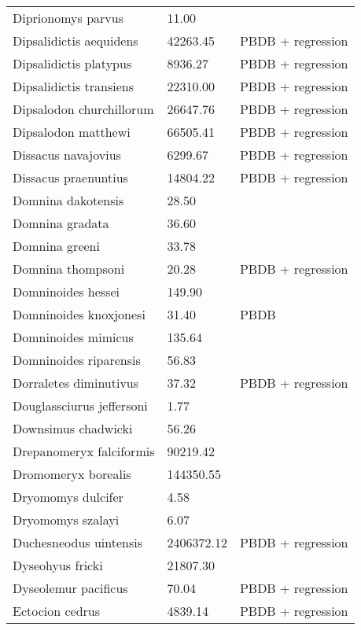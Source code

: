 \documentclass{article}
\begin{document}
\begin{center}
\begin{longtable}{p{} p{} p{}}
    Diprionomys parvus & 11.00 & \cite{McKenna2011} \\ 
    Dipsalidictis aequidens & 42263.45 & PBDB + regression \\ 
    Dipsalidictis platypus & 8936.27 & PBDB + regression \\ 
    Dipsalidictis transiens & 22310.00 & PBDB + regression \\ 
    Dipsalodon churchillorum & 26647.76 & PBDB + regression \\ 
    Dipsalodon matthewi & 66505.41 & PBDB + regression \\ 
    Dissacus navajovius & 6299.67 & PBDB + regression \\ 
    Dissacus praenuntius & 14804.22 & PBDB + regression \\ 
    Domnina dakotensis & 28.50 & \cite{Tomiya2013} \\ 
    Domnina gradata & 36.60 & \cite{Tomiya2013} \\ 
    Domnina greeni & 33.78 & \cite{Tomiya2013} \\ 
    Domnina thompsoni & 20.28 & PBDB + regression \\ 
    Domninoides hessei & 149.90 & \cite{Tomiya2013} \\ 
    Domninoides knoxjonesi & 31.40 & PBDB \\ 
    Domninoides mimicus & 135.64 & \cite{Tomiya2013} \\ 
    Domninoides riparensis & 56.83 & \cite{Tomiya2013} \\ 
    Dorraletes diminutivus & 37.32 & PBDB + regression \\ 
    Douglassciurus jeffersoni & 1.77 & \cite{Mihlbachler2006} \\ 
    Downsimus chadwicki & 56.26 & \cite{Tomiya2013} \\ 
    Drepanomeryx falciformis & 90219.42 & \cite{Tomiya2013} \\ 
    Dromomeryx borealis & 144350.55 & \cite{Tomiya2013} \\ 
    Dryomomys dulcifer & 4.58 & \cite{Novacek1977} \\ 
    Dryomomys szalayi & 6.07 & \cite{Novacek1977} \\ 
    Duchesneodus uintensis & 2406372.12 & PBDB + regression \\ 
    Dyseohyus fricki & 21807.30 & \cite{Tomiya2013} \\ 
    Dyseolemur pacificus & 70.04 & PBDB + regression \\ 
    Ectocion cedrus & 4839.14 & PBDB + regression \\ 

\end{longtable}
\end{center}
\end{document}
